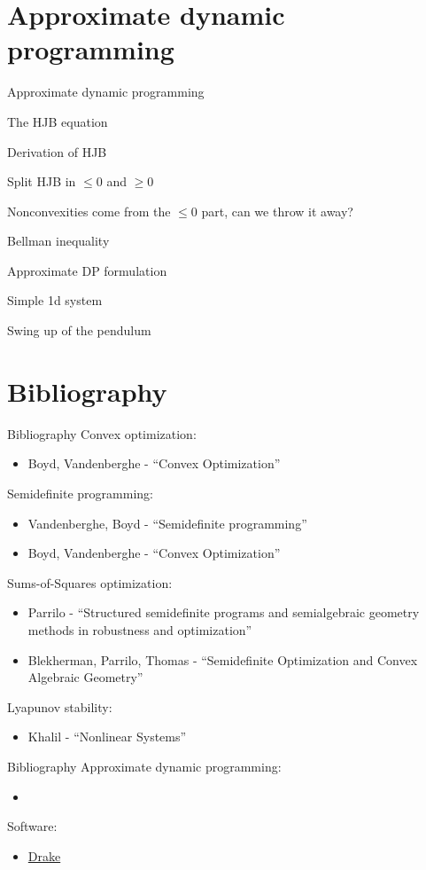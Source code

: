 \documentclass[aspectratio=169]{beamer}
\begin{document}
\section{Approximate dynamic programming}
\begin{frame}
\huge
\centering
{\color{darkred} Approximate dynamic programming}
\end{frame}

\begin{frame}
The HJB equation

Derivation of HJB

Split HJB in $\leq 0$ and $\geq 0$

Nonconvexities come from the $\leq 0$ part, can we throw it away?

Bellman inequality

Approximate DP formulation

Simple 1d system

Swing up of the pendulum
\end{frame}

\section{Bibliography}
\begin{frame}{Bibliography}
\footnotesize
Convex optimization:
\begin{itemize}
\item
Boyd, Vandenberghe - ``Convex Optimization''
\end{itemize}
Semidefinite programming:
\begin{itemize}
\item
Vandenberghe, Boyd - ``Semidefinite programming''
\item
Boyd, Vandenberghe - ``Convex Optimization''
\end{itemize}
Sums-of-Squares optimization:
\begin{itemize}
\item
Parrilo - ``Structured semidefinite programs and semialgebraic geometry methods in robustness and optimization''
\item
Blekherman, Parrilo, Thomas - ``Semidefinite Optimization and Convex Algebraic Geometry''
\end{itemize}
Lyapunov stability:
\begin{itemize}
\item
Khalil - ``Nonlinear Systems''
\end{itemize}
\end{frame}

\begin{frame}{Bibliography}
\footnotesize
Approximate dynamic programming:
\begin{itemize}
\item
\end{itemize}
Software:
\begin{itemize}
\item
\href{https://drake.mit.edu}{{\color{blue}Drake}}
\end{itemize}
\end{frame}
\end{document}
